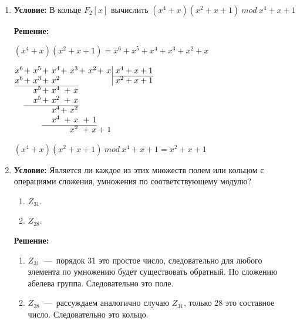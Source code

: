 \documentclass[12pt,a4paper,oneside]{extarticle}
\begin{document}
\begin{enumerate}
        {\bf Решение:}

        $
        \arraycolsep=0.05em
        \begin{array}{rrrr|l}
            x^4 & +~x   & +~1 & & ~x^3+x+1\\
            \cline{5-5}
            x^4 & +~x^2 & +~x & & ~x\\
            \cline{1-3}
                & x^2   & +~1\\            
        \end{array}
        $

        $x^4 + x + 1 ~mod~ x^3 + x + 1 = x^2 + 1$


    \item {\bf Условие:} В кольце $F_2[x]$ вычислить $(x^4 + x)(x^2+x+1) ~mod~ x^4 +x+1$

        {\bf Решение:}

        $(x^4 + x)(x^2+x+1) = x^6+x^5+x^4+x^3+x^2+x$

        $
        \arraycolsep=0.05em
        \begin{array}{rrrrrrr|l}
            x^6 & +~x^5 & +~x^4 &+~x^3 &+~x^2 & +~x & & ~x^4+x+1\\
            \cline{8-8}
            x^6 & +~x^3 & +~x^2 &      &      &     & & ~x^2+x+1\\
            \cline{1-4}
                & x^5   & +~x^4 & +~x\\
                & x^5   & +~x^2 & +~x\\
            \cline{2-4}
                &       & ~x^4  & +~x^2\\
                &       & ~x^4  & +~x & +~1\\
            \cline{3-5}
                &       &       & ~x^2  & +~x & +~1\\
        \end{array}
        $

        $(x^4 + x)(x^2+x+1) ~mod~ x^4+x+1 = x^2+x+1$

    \item {\bf Условие:} Является ли каждое из этих множеств полем или кольцом с операциями сложения, умножения по соответствующему модулю?
    \begin{enumerate}
        \item $Z_{31}$.
        \item $Z_{28}$.
    \end{enumerate}

        {\bf Решение:}

        \begin{enumerate}
            \item $Z_{31}$~---~порядок 31 это простое число, следовательно для любого элемента по умножению будет существовать обратный. По сложению абелева группа. Следовательно это поле.
            \item $Z_{28}$~---~рассуждаем аналогично случаю $Z_{31}$, только 28 это составное число. Следовательно это кольцо.
        \end{enumerate}


\end{enumerate}
\end{document}
